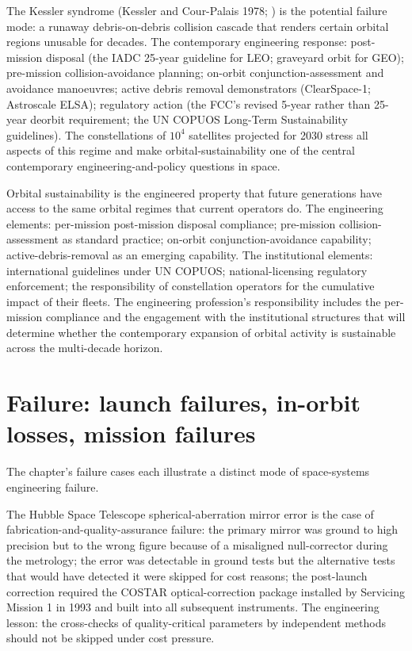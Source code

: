 The Kessler syndrome (Kessler and Cour-Palais 1978; \cite{paper:kessler-1978}) is the potential failure mode: a runaway debris-on-debris collision cascade that renders certain orbital regions unusable for decades. The contemporary engineering response: post-mission disposal (the IADC 25-year guideline for LEO; graveyard orbit for GEO); pre-mission collision-avoidance planning; on-orbit conjunction-assessment and avoidance manoeuvres; active debris removal demonstrators (ClearSpace-1; Astroscale ELSA); regulatory action (the FCC's revised 5-year rather than 25-year deorbit requirement; the UN COPUOS Long-Term Sustainability guidelines). The constellations of $10^4$ satellites projected for 2030 stress all aspects of this regime and make orbital-sustainability one of the central contemporary engineering-and-policy questions in space.

\begin{principle}
Orbital sustainability is the engineered property that future generations have access to the same orbital regimes that current operators do. The engineering elements: per-mission post-mission disposal compliance; pre-mission collision-assessment as standard practice; on-orbit conjunction-avoidance capability; active-debris-removal as an emerging capability. The institutional elements: international guidelines under UN COPUOS; national-licensing regulatory enforcement; the responsibility of constellation operators for the cumulative impact of their fleets. The engineering profession's responsibility includes the per-mission compliance and the engagement with the institutional structures that will determine whether the contemporary expansion of orbital activity is sustainable across the multi-decade horizon.
\end{principle}

\section{Failure: launch failures, in-orbit losses, mission failures}

The chapter's failure cases each illustrate a distinct mode of space-systems engineering failure.

The Hubble Space Telescope spherical-aberration mirror error \cite{acc:nasa-hubble-optical-systems-1990} is the case of fabrication-and-quality-assurance failure: the primary mirror was ground to high precision but to the wrong figure because of a misaligned null-corrector during the metrology; the error was detectable in ground tests but the alternative tests that would have detected it were skipped for cost reasons; the post-launch correction required the COSTAR optical-correction package installed by Servicing Mission 1 in 1993 and built into all subsequent instruments. The engineering lesson: the cross-checks of quality-critical parameters by independent methods should not be skipped under cost pressure.

